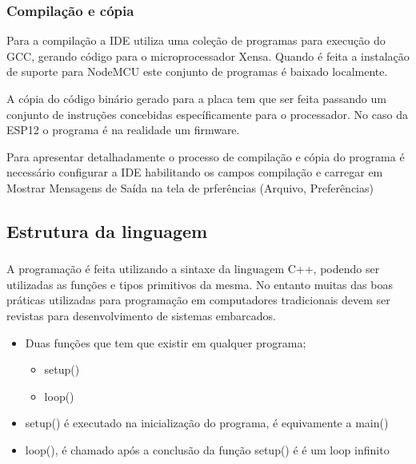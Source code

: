 \documentclass{beamer}
\begin{document}
\begin{frame}[fragile]
\frametitle{Compilação e cópia}
\small
\begin{block}{}
Para a compilação a IDE utiliza uma coleção de programas para execução do GCC, gerando código para o 
microprocessador Xensa. Quando é feita a instalação de suporte para NodeMCU este conjunto de programas
é baixado localmente.
\end{block}

\begin{block}{}
A cópia do código binário gerado para a placa tem que ser feita passando um conjunto de instruções 
concebidas específicamente para o processador. No caso da ESP12 o programa é na realidade um firmware.
\end{block}

\begin{block}{}
Para apresentar detalhadamente o processo de compilação e cópia do programa é necessário configurar a 
IDE habilitando os campos compilação e carregar em Mostrar Mensagens de Saída na tela de prferências
(Arquivo, Preferências)
\end{block}

\end{frame}


\subsection{Estrutura da linguagem}
\begin{frame}[fragile]
\frametitle{}

A programação é feita utilizando a sintaxe da linguagem C++, podendo ser utilizadas as funções
e tipos primitivos da mesma. No entanto muitas das boas práticas utilizadas para programação
em computadores tradicionais devem ser revistas para desenvolvimento de sistemas embarcados.

\begin{itemize}
\item Duas funções que tem que existir em qualquer programa;
\begin{itemize}
\item setup()
\item loop()
\end{itemize}
\item setup() é executado na inicialização do programa, é equivamente a main()
\item loop(), é chamado após a conclusão da função setup() é é um loop infinito
\end{itemize}

\end{frame}
\end{document}
